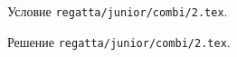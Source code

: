 \problem
Условие \texttt{regatta/junior/combi/2.tex}.

\solution Решение \texttt{regatta/junior/combi/2.tex}.
\endproblem
